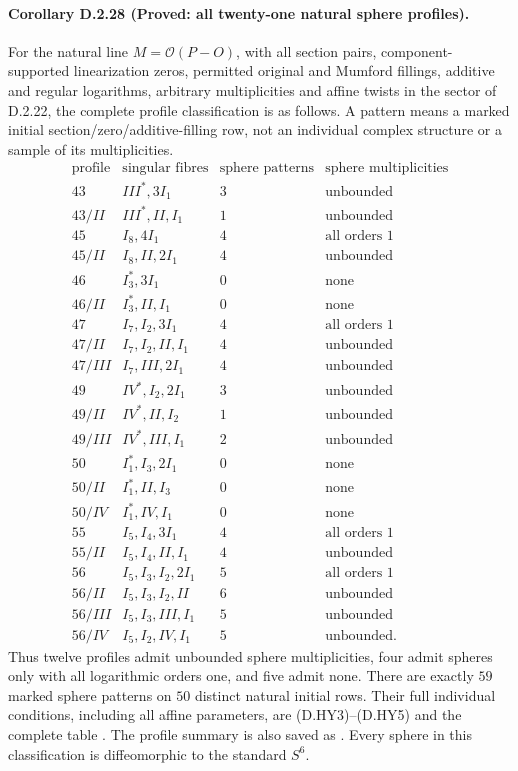 \paragraph{Corollary D.2.28 (Proved: all twenty-one natural sphere profiles).}
For the natural line $M=\mathcal O(P-O)$, with all section pairs,
component-supported linearization zeros, permitted original and
Mumford fillings, additive and regular logarithms, arbitrary
multiplicities and affine twists in the sector of D.2.22, the
complete profile classification is as follows. A pattern means
a marked initial section/zero/additive-filling row, not an
individual complex structure or a sample of its multiplicities.
\[
\begin{array}{c|l|r|l}
\text{profile}&\text{singular fibres}&\text{sphere patterns}
                     &\text{sphere multiplicities}\\\hline
43&III^*,3I_1&3&\text{unbounded}\\
43/II&III^*,II,I_1&1&\text{unbounded}\\
45&I_8,4I_1&4&\text{all orders }1\\
45/II&I_8,II,2I_1&4&\text{unbounded}\\
46&I_3^*,3I_1&0&\text{none}\\
46/II&I_3^*,II,I_1&0&\text{none}\\
47&I_7,I_2,3I_1&4&\text{all orders }1\\
47/II&I_7,I_2,II,I_1&4&\text{unbounded}\\
47/III&I_7,III,2I_1&4&\text{unbounded}\\
49&IV^*,I_2,2I_1&3&\text{unbounded}\\
49/II&IV^*,II,I_2&1&\text{unbounded}\\
49/III&IV^*,III,I_1&2&\text{unbounded}\\
50&I_1^*,I_3,2I_1&0&\text{none}\\
50/II&I_1^*,II,I_3&0&\text{none}\\
50/IV&I_1^*,IV,I_1&0&\text{none}\\
55&I_5,I_4,3I_1&4&\text{all orders }1\\
55/II&I_5,I_4,II,I_1&4&\text{unbounded}\\
56&I_5,I_3,I_2,2I_1&5&\text{all orders }1\\
56/II&I_5,I_3,I_2,II&6&\text{unbounded}\\
56/III&I_5,I_3,III,I_1&5&\text{unbounded}\\
56/IV&I_5,I_2,IV,I_1&5&\text{unbounded}.
\end{array}                                                  \tag{D.ST13}
\]
Thus twelve profiles admit unbounded sphere multiplicities,
four admit spheres only with all logarithmic orders one, and
five admit none. There are exactly $59$ marked sphere patterns
on $50$ distinct natural initial rows. Their full individual
conditions, including all affine parameters, are (D.HY3)--(D.HY5)
and the complete table
.
The profile summary is also saved as
.
Every sphere in this classification is diffeomorphic to the
standard $S^6$.

